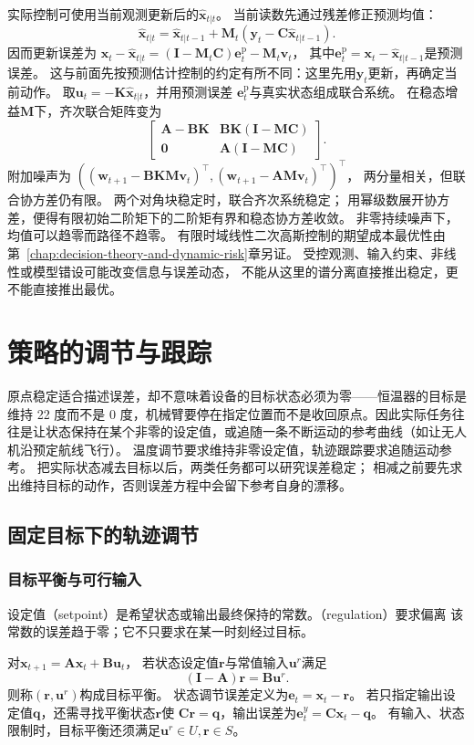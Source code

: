 实际控制可使用当前观测更新后的$\widehat{\bm x}_{t|t}$。
当前读数先通过残差修正预测均值：
\[
  \widehat{\bm x}_{t|t}
  =\widehat{\bm x}_{t|t-1}
   +\bm M_t(\bm y_t-\bm C\widehat{\bm x}_{t|t-1}).
\]
因而更新误差为
$\bm x_t-\widehat{\bm x}_{t|t}
=(\bm I-\bm M_t\bm C)\bm e_t^{\mathrm p}-\bm M_t\bm v_t$，
其中$\bm e_t^{\mathrm p}=\bm x_t-\widehat{\bm x}_{t|t-1}$是预测误差。
这与前面先按预测估计控制的约定有所不同：这里先用$\bm y_t$更新，再确定当前动作。
取$\bm u_t=-\bm K\widehat{\bm x}_{t|t}$，并用预测误差
$\bm e_t^{\mathrm p}$与真实状态组成联合系统。
在稳态增益$\bm M$下，齐次联合矩阵变为
\[
  \begin{bmatrix}
    \bm A-\bm B\bm K&\bm B\bm K(\bm I-\bm M\bm C)\\
    \bm0&\bm A(\bm I-\bm M\bm C)
  \end{bmatrix}.
\]
附加噪声为
$((\bm w_{t+1}-\bm B\bm K\bm M\bm v_t)^\top,
  (\bm w_{t+1}-\bm A\bm M\bm v_t)^\top)^\top$，
两分量相关，但联合协方差仍有限。
两个对角块稳定时，联合齐次系统稳定；
用幂级数展开协方差，便得有限初始二阶矩下的二阶矩有界和稳态协方差收敛。
非零持续噪声下，均值可以趋零而路径不趋零。
有限时域线性二次高斯控制的期望成本最优性由
第~\ref{chap:decision-theory-and-dynamic-risk}章另证。
受控观测、输入约束、非线性或模型错设可能改变信息与误差动态，
不能从这里的谱分离直接推出稳定，更不能直接推出最优。

\section{策略的调节与跟踪}
\label{sec:control-regulation-tracking}

原点稳定适合描述误差，却不意味着设备的目标状态必须为零——恒温器的目标是维持 22 度而不是 0 度，机械臂要停在指定位置而不是收回原点。因此实际任务往往是让状态保持在某个非零的设定值，或追随一条不断运动的参考曲线（如让无人机沿预定航线飞行）。
温度调节要求维持非零设定值，轨迹跟踪要求追随运动参考。
把实际状态减去目标以后，两类任务都可以研究误差稳定；
相减之前要先求出维持目标的动作，否则误差方程中会留下参考自身的漂移。

\subsection{固定目标下的轨迹调节}
\subsubsection{目标平衡与可行输入}
设定值（setpoint）是希望状态或输出最终保持的常数。（regulation）要求偏离
该常数的误差趋于零；它不只要求在某一时刻经过目标。
\begin{definition}[目标平衡与调节误差]
\label{def:control-regulation-equilibrium}
对$\bm x_{t+1}=\bm A\bm x_t+\bm B\bm u_t$，
若状态设定值$\bm r$与常值输入$\bm u^r$满足
\begin{equation}
  (\bm I-\bm A)\bm r=\bm B\bm u^r.
  \label{eq:control-target-equilibrium}
\end{equation}
则称$(\bm r,\bm u^r)$构成目标平衡。
状态调节误差定义为$\bm e_t=\bm x_t-\bm r$。
若只指定输出设定值$\bm q$，还需寻找平衡状态$\bm r$使
$\bm C\bm r=\bm q$，输出误差为$\bm e_t^y=\bm C\bm x_t-\bm q$。
有输入、状态限制时，目标平衡还须满足$\bm u^r\in U,\bm r\in S$。
\end{definition}

